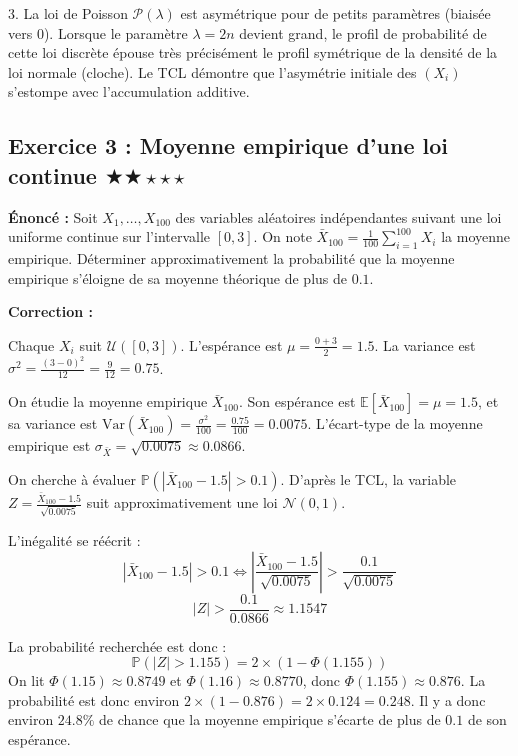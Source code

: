 \documentclass[11pt,a4paper]{article}
\begin{document}
3. La loi de Poisson $\mathcal{P}(\lambda)$ est asymétrique pour de petits paramètres (biaisée vers $0$). Lorsque le paramètre $\lambda = 2n$ devient grand, le profil de probabilité de cette loi discrète épouse très précisément le profil symétrique de la densité de la loi normale (cloche). Le TCL démontre que l'asymétrie initiale des $(X_i)$ s'estompe avec l'accumulation additive.


\vspace{1cm}
\subsection*{Exercice 3 : Moyenne empirique d'une loi continue \quad $\bigstar\bigstar\star\star\star$}

\textbf{Énoncé :}
Soit $X_1, \dots, X_{100}$ des variables aléatoires indépendantes suivant une loi uniforme continue sur l'intervalle $[0, 3]$.
On note $\bar{X}_{100} = \frac{1}{100} \sum_{i=1}^{100} X_i$ la moyenne empirique.
Déterminer approximativement la probabilité que la moyenne empirique s'éloigne de sa moyenne théorique de plus de $0.1$.

\textbf{Correction :}

Chaque $X_i$ suit $\mathcal{U}([0, 3])$.
L'espérance est $\mu = \frac{0 + 3}{2} = 1.5$.
La variance est $\sigma^2 = \frac{(3 - 0)^2}{12} = \frac{9}{12} = 0.75$.

On étudie la moyenne empirique $\bar{X}_{100}$. Son espérance est $\mathbb{E}[\bar{X}_{100}] = \mu = 1.5$, et sa variance est $\text{Var}(\bar{X}_{100}) = \frac{\sigma^2}{100} = \frac{0.75}{100} = 0.0075$.
L'écart-type de la moyenne empirique est $\sigma_{\bar{X}} = \sqrt{0.0075} \approx 0.0866$.

On cherche à évaluer $\mathbb{P}\left( |\bar{X}_{100} - 1.5| > 0.1 \right)$.
D'après le TCL, la variable $Z = \frac{\bar{X}_{100} - 1.5}{\sqrt{0.0075}}$ suit approximativement une loi $\mathcal{N}(0, 1)$.

L'inégalité se réécrit :
$$|\bar{X}_{100} - 1.5| > 0.1 \iff \left| \frac{\bar{X}_{100} - 1.5}{\sqrt{0.0075}} \right| > \frac{0.1}{\sqrt{0.0075}}$$
$$|Z| > \frac{0.1}{0.0866} \approx 1.1547$$

La probabilité recherchée est donc :
$$\mathbb{P}(|Z| > 1.155) = 2 \times (1 - \Phi(1.155))$$
On lit $\Phi(1.15) \approx 0.8749$ et $\Phi(1.16) \approx 0.8770$, donc $\Phi(1.155) \approx 0.876$.
La probabilité est donc environ $2 \times (1 - 0.876) = 2 \times 0.124 = 0.248$.
Il y a donc environ $24.8\%$ de chance que la moyenne empirique s'écarte de plus de $0.1$ de son espérance.
\end{document}
